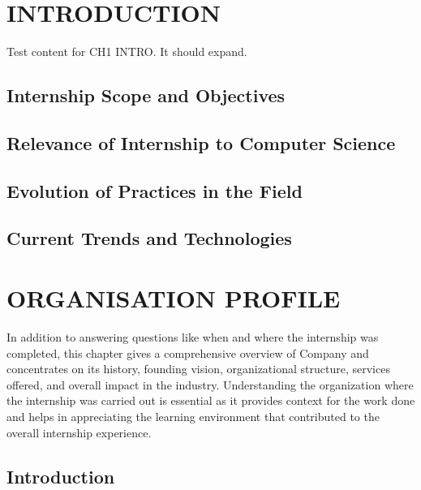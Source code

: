 \documentclass[12pt,a4paper]{report}
\begin{document}
\chapter{INTRODUCTION}
\label{ch:intro}


Test content for CH1 INTRO. It should expand.


\section{Internship Scope and Objectives}


\section{Relevance of Internship to Computer Science}


\section{Evolution of Practices in the Field}


\section{Current Trends and Technologies}




\chapter{ORGANISATION PROFILE}
\label{ch:org}


In addition to answering questions like when and where the internship was completed, this chapter gives a comprehensive overview of Company and concentrates on its history, founding vision, organizational structure, services offered, and overall impact in the industry. Understanding the organization where the internship was carried out is essential as it provides context for the work done and helps in appreciating the learning environment that contributed to the overall internship experience.


\section{Introduction}
\end{document}
